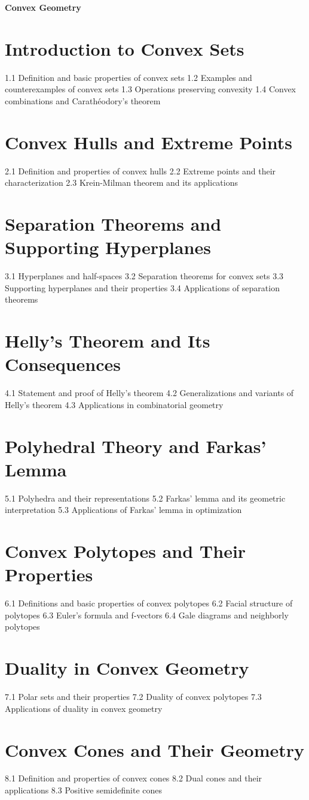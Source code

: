 {\LARGE \bf{Convex Geometry}}
\section{Introduction to Convex Sets}
1.1 Definition and basic properties of convex sets
1.2 Examples and counterexamples of convex sets
1.3 Operations preserving convexity
1.4 Convex combinations and Carathéodory's theorem
\section{Convex Hulls and Extreme Points}
2.1 Definition and properties of convex hulls
2.2 Extreme points and their characterization
2.3 Krein-Milman theorem and its applications
\section{Separation Theorems and Supporting Hyperplanes}
3.1 Hyperplanes and half-spaces
3.2 Separation theorems for convex sets
3.3 Supporting hyperplanes and their properties
3.4 Applications of separation theorems
\section{Helly's Theorem and Its Consequences}
4.1 Statement and proof of Helly's theorem
4.2 Generalizations and variants of Helly's theorem
4.3 Applications in combinatorial geometry
\section{Polyhedral Theory and Farkas' Lemma}
5.1 Polyhedra and their representations
5.2 Farkas' lemma and its geometric interpretation
5.3 Applications of Farkas' lemma in optimization
\section{Convex Polytopes and Their Properties}
6.1 Definitions and basic properties of convex polytopes
6.2 Facial structure of polytopes
6.3 Euler's formula and f-vectors
6.4 Gale diagrams and neighborly polytopes
\section{Duality in Convex Geometry}
7.1 Polar sets and their properties
7.2 Duality of convex polytopes
7.3 Applications of duality in convex geometry
\section{Convex Cones and Their Geometry}
8.1 Definition and properties of convex cones
8.2 Dual cones and their applications
8.3 Positive semidefinite cones
